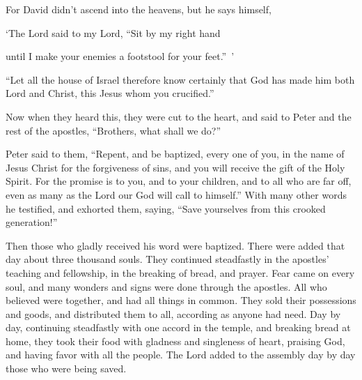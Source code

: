 {For David didn’t ascend into the heavens, but he says himself,
\par }{\Q ‘The Lord said to my Lord, “Sit by my right hand
\par }{\QB {}until I make your enemies a footstool for your feet.” ’
\par }{\PP {}“Let all the house of Israel therefore know certainly that God has made him both Lord and Christ, this Jesus whom you crucified.”
\par }{\PP {}Now when they heard this, they were cut to the heart, and said to Peter and the rest of the apostles, “Brothers, what shall we do?”
\par }{\PP {}Peter said to them, “Repent, and be baptized, every one of you, in the name of Jesus Christ for the forgiveness of sins, and you will receive the gift of the Holy Spirit.
For the promise is to you, and to your children, and to all who are far off, even as many as the Lord our God will call to himself.”
With many other words he testified, and exhorted them, saying, “Save yourselves from this crooked generation!”
\par }{\PP {}Then those who gladly received his word were baptized. There were added that day about three thousand souls.
They continued steadfastly in the apostles’ teaching and fellowship, in the breaking of bread, and prayer.
Fear came on every soul, and many wonders and signs were done through the apostles.
All who believed were together, and had all things in common.
They sold their possessions and goods, and distributed them to all, according as anyone had need.
Day by day, continuing steadfastly with one accord in the temple, and breaking bread at home, they took their food with gladness and singleness of heart,
praising God, and having favor with all the people. The Lord added to the assembly day by day those who were being saved.

}
